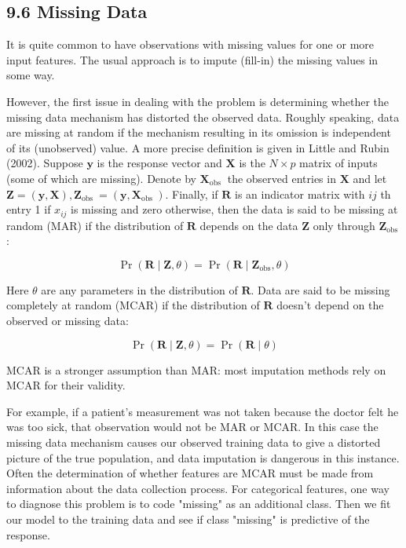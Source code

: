 \documentclass[10pt]{article}
\begin{document}
\subsection*{9.6 Missing Data}
It is quite common to have observations with missing values for one or more input features. The usual approach is to impute (fill-in) the missing values in some way.

However, the first issue in dealing with the problem is determining whether the missing data mechanism has distorted the observed data. Roughly speaking, data are missing at random if the mechanism resulting in its omission is independent of its (unobserved) value. A more precise definition is given in Little and Rubin (2002). Suppose $\mathbf{y}$ is the response vector and $\mathbf{X}$ is the $N \times p$ matrix of inputs (some of which are missing). Denote by $\mathbf{X}_{\text {obs }}$ the observed entries in $\mathbf{X}$ and let $\mathbf{Z}=(\mathbf{y}, \mathbf{X}), \mathbf{Z}_{\text {obs }}=\left(\mathbf{y}, \mathbf{X}_{\text {obs }}\right)$. Finally, if $\mathbf{R}$ is an indicator matrix with $i j$ th entry 1 if $x_{i j}$ is missing and zero otherwise, then the data is said to be missing at random (MAR) if the distribution of $\mathbf{R}$ depends on the data $\mathbf{Z}$ only through $\mathbf{Z}_{\text {obs }}$ :


\begin{equation*}
\operatorname{Pr}(\mathbf{R} \mid \mathbf{Z}, \theta)=\operatorname{Pr}\left(\mathbf{R} \mid \mathbf{Z}_{\mathrm{obs}}, \theta\right) \tag{9.31}
\end{equation*}


Here $\theta$ are any parameters in the distribution of $\mathbf{R}$. Data are said to be missing completely at random (MCAR) if the distribution of $\mathbf{R}$ doesn't depend on the observed or missing data:


\begin{equation*}
\operatorname{Pr}(\mathbf{R} \mid \mathbf{Z}, \theta)=\operatorname{Pr}(\mathbf{R} \mid \theta) \tag{9.32}
\end{equation*}


MCAR is a stronger assumption than MAR: most imputation methods rely on MCAR for their validity.

For example, if a patient's measurement was not taken because the doctor felt he was too sick, that observation would not be MAR or MCAR. In this case the missing data mechanism causes our observed training data to give a distorted picture of the true population, and data imputation is dangerous in this instance. Often the determination of whether features are MCAR must be made from information about the data collection process. For categorical features, one way to diagnose this problem is to code "missing" as an additional class. Then we fit our model to the training data and see if class "missing" is predictive of the response.
\end{document}
